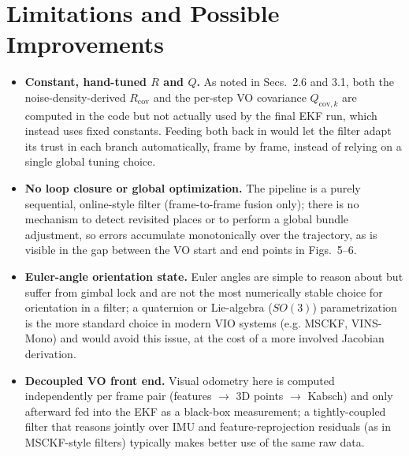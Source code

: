 \documentclass[11pt]{article}
\begin{document}
\section*{Limitations and Possible Improvements}
\begin{itemize}[leftmargin=*]
  \item \textbf{Constant, hand-tuned $R$ and $Q$.} As noted in Secs.~2.6 and 3.1, both the
  noise-density-derived $R_{\text{cov}}$ and the per-step VO covariance $Q_{\text{cov},k}$ are computed
  in the code but not actually used by the final EKF run, which instead uses fixed constants. Feeding
  both back in would let the filter adapt its trust in each branch automatically, frame by frame,
  instead of relying on a single global tuning choice.
  \item \textbf{No loop closure or global optimization.} The pipeline is a purely sequential, online-style
  filter (frame-to-frame fusion only); there is no mechanism to detect revisited places or to perform a
  global bundle adjustment, so errors accumulate monotonically over the trajectory, as is visible in the
  gap between the VO start and end points in Figs.~5--6.
  \item \textbf{Euler-angle orientation state.} Euler angles are simple to reason about but suffer from
  gimbal lock and are not the most numerically stable choice for orientation in a filter; a quaternion
  or Lie-algebra ($SO(3)$) parametrization is the more standard choice in modern VIO systems (e.g.
  MSCKF, VINS-Mono) and would avoid this issue, at the cost of a more involved Jacobian derivation.
  \item \textbf{Decoupled VO front end.} Visual odometry here is computed independently per frame pair
  (features $\to$ 3D points $\to$ Kabsch) and only afterward fed into the EKF as a black-box
  measurement; a tightly-coupled filter that reasons jointly over IMU and feature-reprojection residuals
  (as in MSCKF-style filters) typically makes better use of the same raw data.
\end{itemize}
\end{document}
